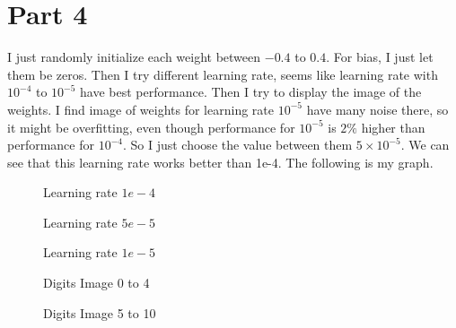 \documentclass[12pt]{article}
\begin{document}
\section*{Part 4}
I just randomly initialize each weight between $-0.4$ to $0.4$. For bias, I just let them be zeros. Then I try different learning rate, seems like learning rate with $10^{-4}$ to $10^{-5}$ have best performance. Then I try to display the image of the weights. I find image of weights for learning rate $10^{-5}$ have many noise there, so it might be overfitting, even though performance for $10^{-5}$ is $2\%$ higher than performance for $10^{-4}$. So I just choose the value between them $5\times 10^{-5}$. We can see that this learning rate works better than 1e-4. The following is my graph.
\begin{figure}[H]
    \qquad
    \caption{Learning rate $1e-4$}
\end{figure}
\begin{figure}[H]
    \qquad
    \caption{Learning rate $5e-5$}
\end{figure}
\begin{figure}[H]
    \qquad
    \caption{Learning rate $1e-5$}
\end{figure}
\begin{figure}[h]
    \caption{Digits Image 0 to 4}
\end{figure}
\begin{figure}[h]
    \caption{Digits Image 5 to 10}
\end{figure}
\end{document}
